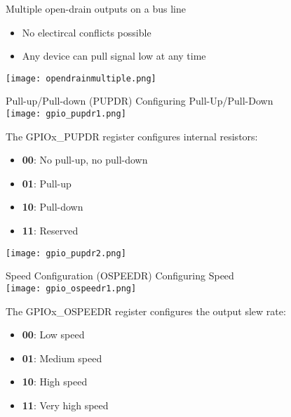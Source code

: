 \begin{corollary}{Multiple open-drain outputs on a bus line}
    \begin{itemize}
        \item No electircal conflicts possible
        \item Any device can pull signal low at any time
    \end{itemize}
    \vspace{3mm}
    \texttt{[image: opendrainmultiple.png]}
\end{corollary}

\multend

\begin{concept}{Pull-up/Pull-down (PUPDR)} Configuring Pull-Up/Pull-Down\\
    \texttt{[image: gpio\_pupdr1.png]}

    \begin{minipage}{0.6\linewidth}
    The GPIOx\_PUPDR register configures internal resistors:
    \begin{itemize}
        \item \textbf{00}: No pull-up, no pull-down
        \item \textbf{01}: Pull-up
        \item \textbf{10}: Pull-down
        \item \textbf{11}: Reserved
    \end{itemize}
    \end{minipage}
    \begin{minipage}{0.4\linewidth}
        \texttt{[image: gpio\_pupdr2.png]}
    \end{minipage}
\end{concept}

\begin{concept}{Speed Configuration (OSPEEDR)} Configuring Speed\\
    \texttt{[image: gpio\_ospeedr1.png]}
   
    The GPIOx\_OSPEEDR register configures the output slew rate:
    \begin{itemize}
        \item \textbf{00}: Low speed
        \item \textbf{01}: Medium speed
        \item \textbf{10}: High speed
        \item \textbf{11}: Very high speed
    \end{itemize}
\end{concept}

